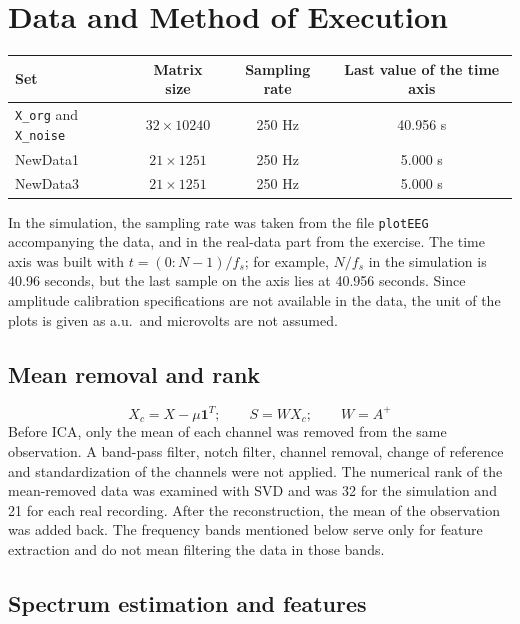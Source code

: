\section{Data and Method of Execution}

\begin{center}
\begin{tabular}{@{}lccc@{}}
\toprule
\textbf{Set} & \textbf{Matrix size} & \textbf{Sampling rate} & \textbf{Last value of the time axis}\\
\midrule
\texttt{X\_org} and \texttt{X\_noise} & $32\times10240$ & 250 Hz & 40.956 s\\
NewData1 & $21\times1251$ & 250 Hz & 5.000 s\\
NewData3 & $21\times1251$ & 250 Hz & 5.000 s\\
\bottomrule
\end{tabular}
\end{center}

In the simulation, the sampling rate was taken from the file \texttt{plotEEG} accompanying the data, and in the real-data part from the exercise. The time axis was built with $t=(0{:}N{-}1)/f_s$; for example, $N/f_s$ in the simulation is 40.96 seconds, but the last sample on the axis lies at 40.956 seconds. Since amplitude calibration specifications are not available in the data, the unit of the plots is given as a.u.\ and microvolts are not assumed.

\subsection*{Mean removal and rank}
\begin{equation}
X_c = X-\mu\mathbf{1}^{T};\qquad S=WX_c;\qquad W=A^{+}
\end{equation}
Before ICA, only the mean of each channel was removed from the same observation. A band-pass filter, notch filter, channel removal, change of reference and standardization of the channels were not applied. The numerical rank of the mean-removed data was examined with SVD and was 32 for the simulation and 21 for each real recording. After the reconstruction, the mean of the observation was added back. The frequency bands mentioned below serve only for feature extraction and do not mean filtering the data in those bands.

\subsection*{Spectrum estimation and features}

